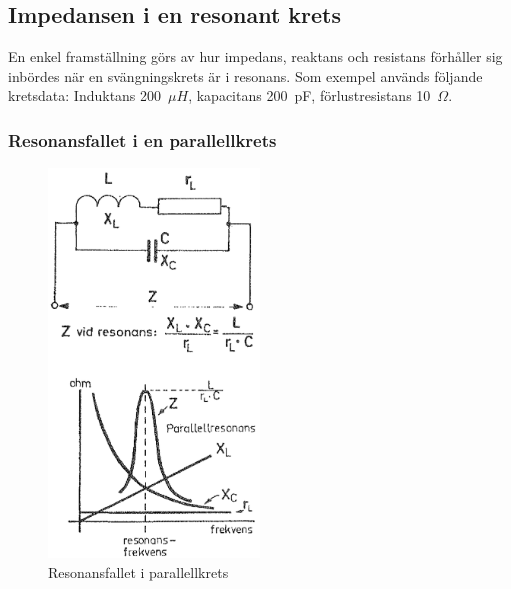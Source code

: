 \subsection{Impedansen i en resonant krets}

En enkel framställning görs av hur impedans, reaktans och resistans förhåller
sig inbördes när en svängningskrets är i resonans.
Som exempel används följande kretsdata: Induktans 200~\(\mu H\),
kapacitans 200~pF, förlustresistans 10~\(\Omega\).

\subsubsection{Resonansfallet i en parallellkrets}
\label{parallellresonans}

\begin{figure}[ht]
\begin{center}
  \includegraphics[width=0.5\textwidth]{images/cropped_pdfs/bild_2_3-18.pdf}
  \caption{Resonansfallet i parallellkrets}
  \label{fig:BildII3-18}
\end{center}
\end{figure}

